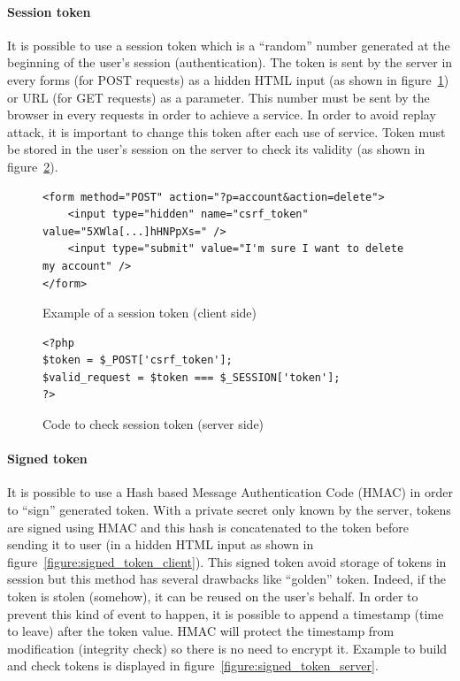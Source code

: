 \documentclass[a4paper,11pt,openany]{report}
\begin{document}
  \paragraph{Session token}
  It is possible to use a session token which is a ``random'' number generated at the beginning 
  of the user's session (authentication). The token is sent by the server in every forms (for POST 
  requests) as a hidden HTML input (as shown in figure~\ref{figure:session_token_client}) or URL 
  (for GET requests) as a parameter. This number must be sent by the browser in every requests in 
  order to achieve a service. In order to avoid replay attack, it is important to change this token 
  after each use of service. Token must be stored in the user's session on the server to check its 
  validity (as shown in figure~\ref{figure:session_token_server}).
  
  \begin{figure}[h!t]
  \begin{verbatim}
<form method="POST" action="?p=account&action=delete">
    <input type="hidden" name="csrf_token" value="5XWla[...]hHNPpXs=" />
    <input type="submit" value="I'm sure I want to delete my account" />
</form>
  \end{verbatim}
  \caption{Example of a session token (client side)}
  \label{figure:session_token_client}
  \end{figure}
  
  \begin{figure}[h!t]
  \begin{verbatim}
<?php
$token = $_POST['csrf_token'];
$valid_request = $token === $_SESSION['token'];
?>
  \end{verbatim}
  \caption{Code to check session token (server side)}
  \label{figure:session_token_server}
  \end{figure}
  
  \paragraph{Signed token} %
  It is possible to use a Hash based Message Authentication Code (HMAC) in order to ``sign'' 
  generated token. With a private secret only known by the server, tokens are signed using 
  HMAC and this hash is concatenated to the token before sending it to user (in a hidden 
  HTML input as shown in figure~\ref{figure:signed_token_client}). This signed token avoid 
  storage of tokens in session but this method has several drawbacks like ``golden'' token. 
  Indeed, if the token is stolen (somehow), it can be reused on the user's behalf. In order 
  to prevent this kind of event to happen, it is possible to append a timestamp (time to 
  leave) after the token value. HMAC will protect the timestamp from modification (integrity 
  check) so there is no need to encrypt it. Example to build and check tokens is displayed 
  in figure~\ref{figure:signed_token_server}.
  
\end{document}
